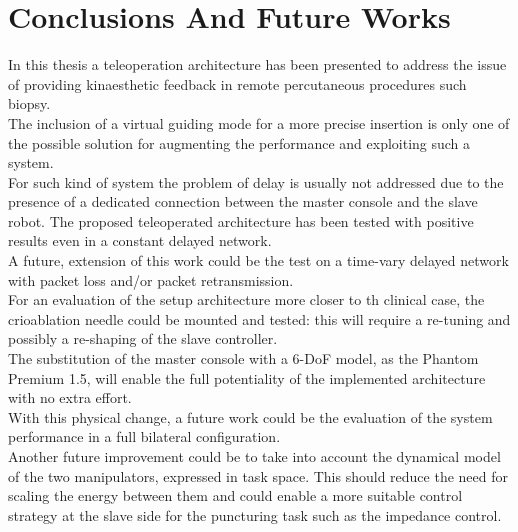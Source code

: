 \chapter*{Conclusions And Future Works}
In this thesis a teleoperation architecture has been presented to address the issue of providing kinaesthetic feedback in remote percutaneous procedures such biopsy.\\
The inclusion of a virtual guiding mode for a more precise insertion is only one of the possible solution for augmenting the performance and exploiting such a system.\\
For such kind of system the problem of delay is usually not addressed due to the presence of a dedicated connection between the master console  and the slave robot.
The proposed teleoperated architecture has been tested with positive results even in a constant delayed network.\\
A future, extension of this work could be the test on a time-vary delayed network with packet loss and/or packet retransmission.\\
For an evaluation of the setup architecture more closer to th clinical case, the crioablation needle could be mounted and tested: this will require a re-tuning and possibly a re-shaping of the slave controller.\\
The substitution of the master console with a 6-DoF model, as the Phantom Premium 1.5, will enable the full potentiality of the implemented architecture with no extra effort.\\
With this physical change, a future work could be the evaluation of the system performance in a full bilateral configuration.\\
Another future improvement could be to take into account the dynamical model of the two manipulators, expressed in task space. This should reduce the need for scaling the energy between them and could enable a more suitable control strategy at the slave side for the puncturing task such as the impedance control. 
 

\clearpage
\thispagestyle{empty}